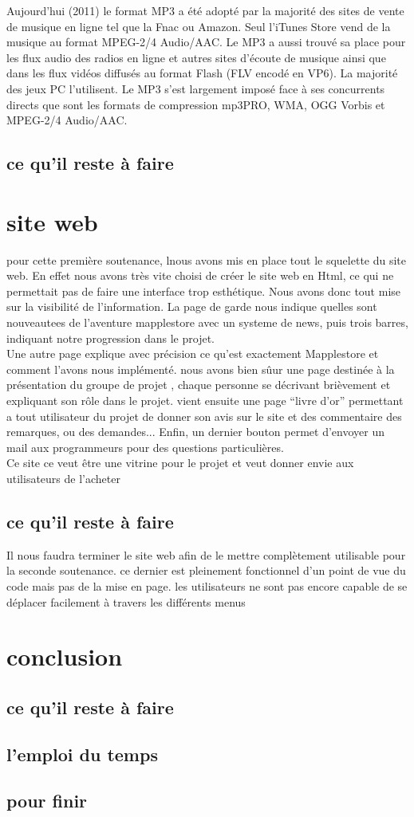 \documentclass{report}
\begin{document}
Aujourd'hui (2011) le format MP3 a été adopté par la majorité des sites de vente de musique en ligne tel que la Fnac ou Amazon. Seul l'iTunes Store vend de la musique au format MPEG-2/4 Audio/AAC. Le MP3 a aussi trouvé sa place pour les flux audio des radios en ligne et autres sites d'écoute de musique ainsi que dans les flux vidéos diffusés au format Flash (FLV encodé en VP6). La majorité des jeux PC l'utilisent. Le MP3 s'est largement imposé face à ses concurrents directs que sont les formats de compression mp3PRO, WMA, OGG Vorbis et MPEG-2/4 Audio/AAC.

\section{ce qu'il reste à faire}


\chapter{site web}

pour cette première soutenance, lnous avons mis en place tout le squelette du site web. En effet nous avons très vite choisi de créer le site web en Html, ce qui ne permettait pas de faire une interface trop esthétique. Nous avons donc tout mise sur la visibilité de l'information. La page de garde nous indique quelles sont nouveautees de l'aventure mapplestore avec un systeme de news, puis trois barres, indiquant notre progression dans le projet. \\
Une autre page explique avec précision ce qu'est exactement Mapplestore et comment l'avons nous implémenté. nous avons bien sûur une page destinée à la présentation du groupe de projet , chaque personne se décrivant brièvement et expliquant son rôle dans le projet. vient ensuite une page ``livre d'or'' permettant a tout utilisateur du projet de donner son avis sur le site et des commentaire des remarques, ou des demandes... Enfin, un dernier bouton permet d'envoyer un mail aux programmeurs pour des questions particulières.\\
 Ce site ce veut être une vitrine pour le projet et veut donner envie aux utilisateurs de l'acheter

\section{ce qu'il reste à faire}
Il nous faudra terminer le site web afin de le mettre complètement utilisable pour la seconde soutenance. ce dernier est pleinement fonctionnel d'un point de vue du code mais pas de la mise en page. les utilisateurs ne sont pas encore capable de se déplacer facilement à travers les différents menus
\chapter{conclusion}
\section{ce qu'il reste à faire}
\section{l'emploi du temps}
\section{pour finir}


\end{document}
